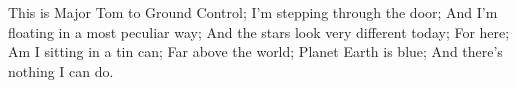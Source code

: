 This is Major Tom to Ground Control;
I'm stepping through the door;
And I'm floating in a most peculiar way;
And the stars look very different today;
For here;
Am I sitting in a tin can;
Far above the world;
Planet Earth is blue;
And there's nothing I can do.
